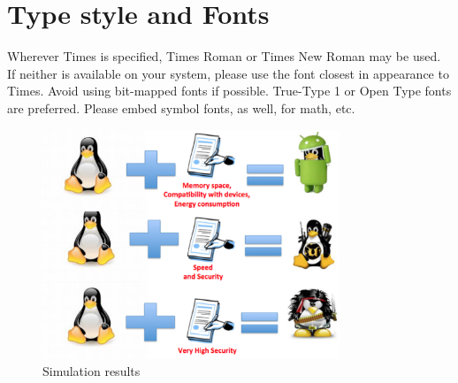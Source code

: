 \documentclass[10pt, conference, compsocconf]{IEEEtran}
\begin{document}
\section{Type style and Fonts}
Wherever Times is specified, Times Roman or Times New Roman may be used. If neither is available on your system, please use the font closest in appearance to Times. Avoid using bit-mapped fonts if possible. True-Type 1 or Open Type fonts are preferred. Please embed symbol fonts, as well, for math, etc.


%
%


%

\begin{figure}[!t]
\centering
\includegraphics[width=3.5in]{tux.png}%
\caption{Simulation results}
\label{fig_sim}
\vspace*{-9mm}
\end{figure}
\end{document}
